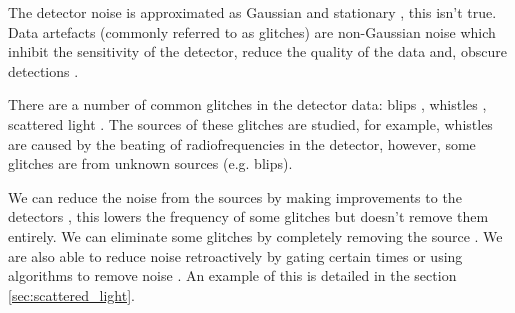 The detector noise is approximated as Gaussian and stationary \cite{gaussian_noise}, this isn't true.
Data artefacts (commonly referred to as glitches) are non-Gaussian noise which inhibit the sensitivity of the
detector, reduce the quality of the data and, obscure \gw detections \cite{transient_noise}.

There are a number of common glitches in the detector data: blips \cite{blips}, whistles \cite{whistles},
scattered light \cite{Accadia}. The sources of these glitches are studied, for example, whistles are caused by the
beating of radiofrequencies in the detector, however, some glitches are from unknown sources (e.g. blips).

We can reduce the noise from the sources by making improvements to the detectors \cite{soni_scattered}, this lowers the
frequency of some glitches but doesn't remove them entirely. We can eliminate some glitches by completely removing the
source \cite{laura_char}. We are also able to reduce noise retroactively by gating certain times or using algorithms to
remove noise \cite{cit_science_soni}. An example of this is detailed in the section \ref{sec:scattered_light}.